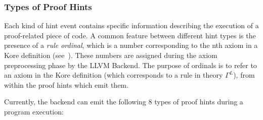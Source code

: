 \documentclass{article}
\theoremstyle{plain}
\theoremstyle{definition}
\begin{document}
\subsubsection{Types of Proof Hints} \label{subsec:types_proof_hints}

Each kind of hint event contains specific information describing the execution of a proof-related piece of code. A common feature between different hint types is the presence of a \textit{rule ordinal}, which is a number corresponding to the nth axiom in a Kore definition (see~). These numbers are assigned during the axiom preprocessing phase by the LLVM Backend. The purpose of ordinals is to refer to an axiom in the Kore definition (which corresponds to a rule in theory $\Gamma^L$), from within the proof hints which emit them.

Currently, the backend can emit the following 8 types of proof hints during a program execution:
\end{document}
